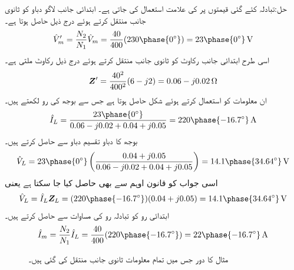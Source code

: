 حل:تبادلہ کئے گئی قیمتوں پر  کی علامت استعمال کی جاتی ہے۔ ابتدائی جانب لاگو دباو کو ثانوی جانب منتقل کرتے ہوئے درج ذیل حاصل ہوتا ہے۔
\begin{align*}
\hat{V}_m'=\frac{N_2}{N_1} \hat{V}_m=\frac{40}{400} (230\phase{0^{\circ}})=23\phase{0^{\circ}}\,\si{\volt}
\end{align*}
اسی طرح ابتدائی جانب رکاوٹ کو ثانوی جانب منتقل کرتے ہوئے درج ذیل رکاوٹ ملتی ہے۔
\begin{align*}
{\ensuremath{{\boldsymbol{Z}}}}'=\frac{40^2}{400^2} (6-j2)=0.06-j0.02\,\si{\ohm}
\end{align*}
ان معلومات کو استعمال کرتے ہوئے شکل  حاصل ہوتا ہے جس سے  بوجھ کی رو لکھتے ہیں۔
\begin{align*}
\hat{I}_L=\frac{23\phase{0^{\circ}}}{0.06-j0.02+0.04+j0.05}=220\phase{-16.7^{\circ}}\,\si{\ampere}
\end{align*}
بوجھ کا دباو تقسیم دباو سے حاصل کرتے ہیں۔
\begin{align*}
\hat{V}_L=23\phase{0^{\circ}} \left(\frac{0.04+j0.05}{0.06-j0.02+0.04+j0.05}\right)=14.1\phase{34.64^{\circ}}\,\si{\volt}
\end{align*}
اسی جواب کو قانون اوہم سے بھی حاصل کیا جا سکتا ہے یعنی
\begin{align*}
\hat{V}_L=\hat{I}_L \bZ_L=(220\phase{-16.7^{\circ}})(0.04+j0.05)=14.1\phase{34.64^{\circ}}\,\si{\volt}
\end{align*}
ابتدائی رو کو تبادلہ رو کی مساوات سے حاصل کرتے ہیں۔
\begin{align*}
\hat{I}_m=\frac{N_2}{N_1} \hat{I}_L=\frac{40}{400} (220\phase{-16.7^{\circ}})=22\phase{-16.7^{\circ}}\,\si{\ampere}
\end{align*}
%
\begin{figure}
\centering
{}
\caption{مثال  کا دور جس میں تمام معلومات ثانوی جانب منتقل کی گئی ہیں۔}
\label{شکل_مقناطیسی_ثانوی_جانب_منتقلی}
\end{figure}

